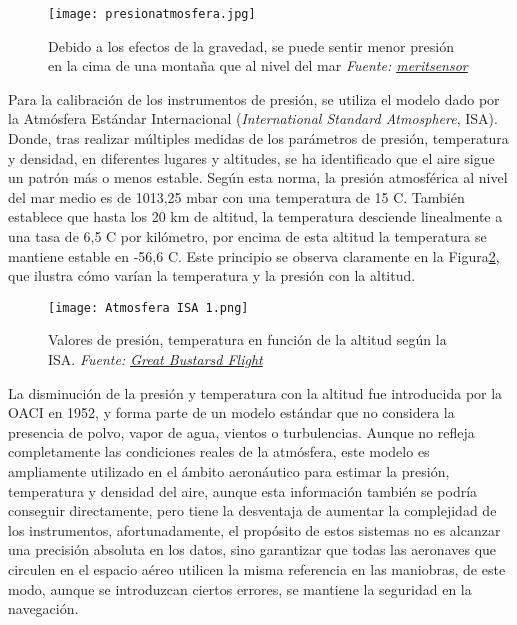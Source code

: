 \begin{figure}[H] 
	\centering %
	\texttt{[image: presionatmosfera.jpg]} %
	\caption{\centering Debido a los efectos de la gravedad, se puede sentir menor presión en la cima de una montaña que al nivel del mar \textit{Fuente: \href{https://meritsensor.com/es/comprender-el-uso-y-la-funci\%C3\%B3n-de-los-sensores-de-presi\%C3\%B3n-piezoresistivos-mems/}{meritsensor}}}
	\label{fig:mi_figurasa} %
\end{figure}

Para la calibración de los instrumentos de presión, se utiliza el modelo dado por la Atmósfera Estándar Internacional (\textit{International Standard Atmosphere}, ISA). Donde, tras realizar múltiples medidas de los parámetros de presión, temperatura y densidad, en diferentes lugares y altitudes, se ha identificado que  el aire sigue un patrón más o menos estable. Según esta norma, la presión atmosférica al nivel del mar medio es de 1013,25 mbar con una temperatura de 15 \textdegree C.  También establece que hasta los 20 km de altitud, la temperatura desciende linealmente a una tasa de 6,5 \textdegree C por kilómetro, por encima de esta altitud la temperatura se mantiene estable en -56,6 \textdegree C. Este principio se observa claramente en la Figura\ref{fig:mi_figura}, que ilustra cómo varían la temperatura y la presión con la altitud.\\
\begin{figure}[H] 
	\centering %
	\texttt{[image: Atmosfera ISA 1.png]} %
	\caption{\centering Valores de presión, temperatura en función de la altitud según la ISA. \textit{Fuente: \href{https://greatbustardsflight.blogspot.com/2015/01/la-atmosfera-estandar.html}{Great Bustarsd Flight}}}
	\label{fig:mi_figura} %
\end{figure}

La disminución de la presión y temperatura con la altitud fue introducida por la OACI en 1952, y forma parte de un modelo estándar que no considera la presencia de polvo, vapor de agua, vientos o turbulencias. Aunque no refleja completamente las condiciones reales de la atmósfera, este modelo es ampliamente utilizado en el ámbito aeronáutico para estimar la presión, temperatura y densidad del aire, aunque esta información también se podría conseguir directamente, pero tiene la desventaja de aumentar la complejidad de los instrumentos, afortunadamente, el  propósito de estos sistemas no es alcanzar una precisión absoluta en los datos, sino garantizar que todas las aeronaves que circulen en el espacio aéreo utilicen la misma referencia en las maniobras, de este modo, aunque se introduzcan ciertos errores, se mantiene la seguridad en la navegación.\\

